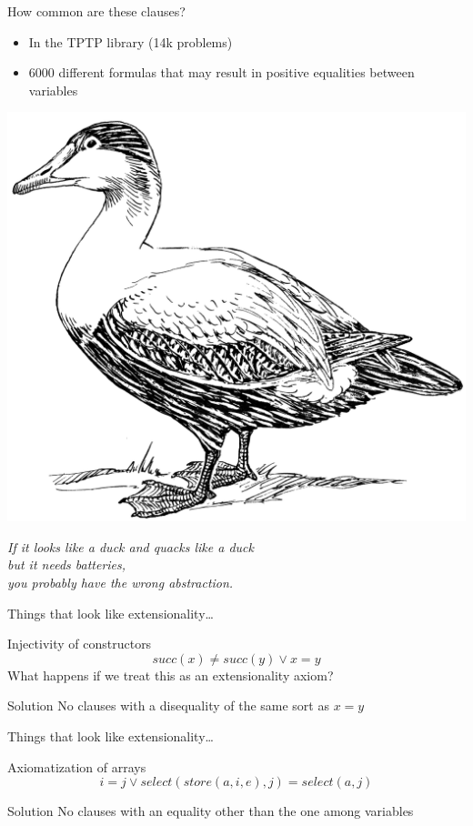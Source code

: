 \begin{frame}
  \begin{block}{How common are these clauses?}
    \begin{itemize}
    \item In the TPTP library (14k problems)
    \item 6000 different formulas that may result in positive
      equalities between variables
    \end{itemize}
  \end{block}
\end{frame}

\begin{frame}
  \begin{center}
    \includegraphics[width=.25\textwidth]{duck}
    
    \textit{If it looks like a duck and quacks like a duck\\ but it needs
    batteries,\\you probably have the wrong abstraction.}
  \end{center}
\end{frame}

\begin{frame}{Things that look like extensionality\dots}
  \begin{block}{Injectivity of constructors}
    \[
    succ(x) \neq succ(y) \lor x = y
    \]
    What happens if we treat this as an extensionality axiom?
  \end{block}
  
  \begin{block}{Solution}
    No clauses with a disequality of the same sort as $x = y$
  \end{block}
\end{frame}

\begin{frame}{Things that look like extensionality\dots}
  \begin{block}{Axiomatization of arrays}
    \[
    i = j \lor select(store(a,i,e), j) = select(a, j)
    \]
  \end{block}

  \begin{block}{Solution}
    No clauses with an equality other than the one among variables
  \end{block}
\end{frame}

